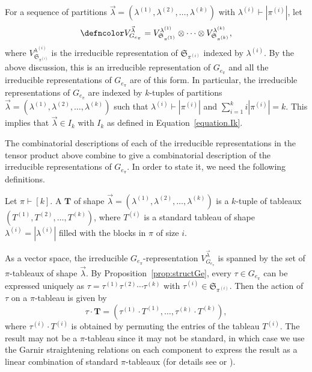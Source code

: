 For a sequence of partitions
$\vec{\lambda} = (\lambda^{(1)}, \lambda^{(2)}, \ldots, \lambda^{(k)})$
with $\lambda^{(i)} \vdash |\pi^{(i)}|$,
let
\begin{equation*}
    {\defncolor V_{G_{e_\pi}}^{\vec{\lambda}}} =
    V_{\mathfrak{S}_{\pi^{(1)}}}^{\lambda^{(1)}}
    \otimes \cdots \otimes
    V_{\mathfrak{S}_{\pi^{(k)}}}^{\lambda^{(k)}},
\end{equation*}
where $V_{\mathfrak{S}_{\pi^{(i)}}}^{\lambda^{(i)}}$ is the irreducible
representation of $\mathfrak{S}_{\pi^{(i)}}$ indexed by $\lambda^{(i)}$.
By the above discussion, this is an irreducible representation of $G_{e_\pi}$
and all the irreducible representations of $G_{e_\pi}$ are of this form.
In particular, the irreducible representations of $G_{e_\pi}$ are indexed by
$k$-tuples of partitions
$\vec{\lambda} = (\lambda^{(1)}, \lambda^{(2)}, \ldots, \lambda^{(k)})$ such that
$\lambda^{(i)} \vdash |\pi^{(i)}|$ and $\sum_{i=1}^k i |\pi^{(i)}| = k$.
This implies that $\vec{\lambda}\in I_k$ with $I_k$ as defined in Equation~\eqref{equation.Ik}.

The combinatorial descriptions of each of the irreducible representations in
the tensor product above combine to give a combinatorial description of the
irreducible representations of $G_{e_\pi}$. In order to state it, we need the
following definitions.

\begin{definition}
Let $\pi \vdash [k]$.
A  $\mathbf{T}$ of shape
$\vec{\lambda} = (\lambda^{(1)}, \lambda^{(2)}, \ldots, \lambda^{(k)})$
is a
$k$-tuple of tableaux $(T^{(1)}, T^{(2)}, \ldots, T^{(k)})$,
where  $T^{(i)}$ is a standard tableau of shape $\lambda^{(i)} = |\lambda^{(i)}|$
filled with the blocks in $\pi$ of size $i$.
\end{definition}

As a vector space, the irreducible $G_{e_\pi}$-representation
$V^{\vec{\lambda}}_{G_{e_\pi}}$ is spanned by the set of $\pi$-tableaux
of shape $\vec{\lambda}$.
By Proposition~\ref{prop:structGe},
every $\tau\in G_{e_\pi}$ can be expressed uniquely as $\tau = \tau^{(1)}
\tau^{(2)} \cdots  \tau^{(k)}$ with $\tau^{(i)} \in \mathfrak{S}_{\pi^{(i)}}$.
Then the action of $\tau$ on a $\pi$-tableau is given by
\begin{equation*}
    \tau \cdot \mathbf{T} = ( \tau^{(1)}\cdot T^{(1)}, \ldots, \tau^{(k)}\cdot T^{(k)}),
\end{equation*}
where $\tau^{(i)} \cdot T^{(i)}$ is obtained by permuting the entries of the tableau $T^{(i)}$.
The result may not be a $\pi$-tableau since it may not be standard,
in which case we use the Garnir straightening relations on each component
to express the result as a linear combination of standard $\pi$-tableaux
(for details see \cite[Section 2.6]{Sagan.2001} or \cite{CarreLascouxLeclerc}).

